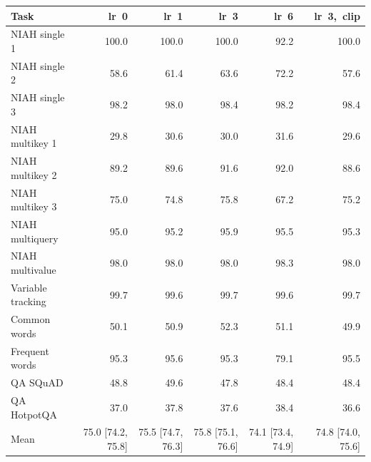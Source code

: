 \begin{tabular}{lrrrrr}
\toprule
Task & lr~0 & lr~1 & lr~3 & lr~6 & lr~3,~clip \\
\midrule
NIAH single 1 & 100.0 & 100.0 & 100.0 & 92.2 & 100.0 \\
NIAH single 2 & 58.6 & 61.4 & 63.6 & 72.2 & 57.6 \\
NIAH single 3 & 98.2 & 98.0 & 98.4 & 98.2 & 98.4 \\
NIAH multikey 1 & 29.8 & 30.6 & 30.0 & 31.6 & 29.6 \\
NIAH multikey 2 & 89.2 & 89.6 & 91.6 & 92.0 & 88.6 \\
NIAH multikey 3 & 75.0 & 74.8 & 75.8 & 67.2 & 75.2 \\
NIAH multiquery & 95.0 & 95.2 & 95.9 & 95.5 & 95.3 \\
NIAH multivalue & 98.0 & 98.0 & 98.0 & 98.3 & 98.0 \\
Variable tracking & 99.7 & 99.6 & 99.7 & 99.6 & 99.7 \\
Common words & 50.1 & 50.9 & 52.3 & 51.1 & 49.9 \\
Frequent words & 95.3 & 95.6 & 95.3 & 79.1 & 95.5 \\
QA SQuAD & 48.8 & 49.6 & 47.8 & 48.4 & 48.4 \\
QA HotpotQA & 37.0 & 37.8 & 37.6 & 38.4 & 36.6 \\
\midrule
Mean & 75.0 [74.2, 75.8] & 75.5 [74.7, 76.3] & 75.8 [75.1, 76.6] & 74.1 [73.4, 74.9] & 74.8 [74.0, 75.6] \\
\bottomrule
\end{tabular}
